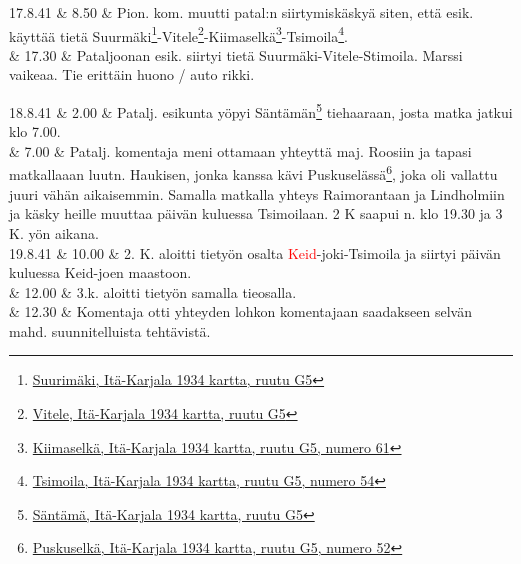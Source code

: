\documentclass[11pt,a5paper,oneside]{book}
\begin{document}
17.8.41 & 8.50 & Pion. kom. muutti patal:n siirtymiskäskyä siten, että esik. käyttää tietä Suurmäki\footnote{\href{https://www.google.fi/maps/place/Bol'shiye+Gory,+Republic+of+Karelia,+Russia/}{Suurimäki, Itä-Karjala 1934 kartta, ruutu G5}}-Vitele\footnote{\href{https://www.google.fi/maps/place/Vidlitsa,+Republic+of+Karelia,+Russia,+186007/}{Vitele, Itä-Karjala 1934 kartta, ruutu G5}}-Kiimaselkä\footnote{\href{https://www.google.fi/maps/place/Kimusel'gskoye/@61.200226,32.7254117,16z/}{Kiimaselkä, Itä-Karjala 1934 kartta, ruutu G5, numero 61}}-Tsimoila\footnote{\href{https://www.google.fi/maps/place/61\%C2\%B013'40.5\%22N+32\%C2\%B044'50.1\%22E/@61.227911,32.7450663,906m/}{Tsimoila, Itä-Karjala 1934 kartta, ruutu G5, numero 54}}. \\

& 17.30 & Pataljoonan esik. siirtyi tietä Suurmäki-Vitele-Stimoila. Marssi vaikeaa. Tie erittäin huono / auto rikki. \\
\newpage

18.8.41 & 2.00 & Patalj. esikunta yöpyi Säntämän\footnote{\href{https://www.google.fi/maps/place/Syandeba,+Republic+of+Karelia,+Russia,+186006/}{Säntämä, Itä-Karjala 1934 kartta, ruutu G5}} tiehaaraan, josta matka jatkui klo 7.00. \\ 

& 7.00 & Patalj. komentaja meni ottamaan yhteyttä maj. Roosiin ja tapasi matkallaaan luutn. Haukisen, jonka kanssa kävi Puskuselässä\footnote{\href{https://www.google.fi/maps/place/61\%C2\%B016'38.2\%22N+32\%C2\%B057'08.2\%22E/@61.277273,32.9500943,905m/}{Puskuselkä, Itä-Karjala 1934 kartta, ruutu G5, numero 52}}, joka oli vallattu juuri vähän aikaisemmin. Samalla matkalla yhteys Raimorantaan ja Lindholmiin ja käsky heille muuttaa päivän kuluessa Tsimoilaan. 2 K saapui n. klo 19.30 ja 3 K. yön aikana. \newline\newline\newline \\

19.8.41 & 10.00 & 2. K. aloitti tietyön osalta \textcolor{red}{Keid}-joki-Tsimoila ja siirtyi päivän kuluessa Keid-joen maastoon. \\

& 12.00 & 3.k. aloitti tietyön samalla tieosalla. \\

& 12.30 & Komentaja otti yhteyden lohkon komentajaan saadakseen selvän mahd. suunnitelluista tehtävistä. \\
\end{document}
